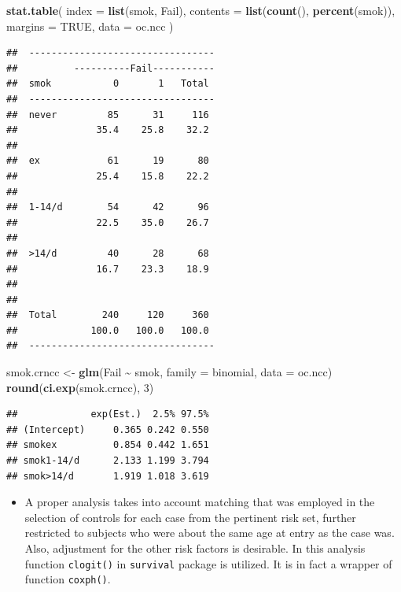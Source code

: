 \documentclass[
]{book}
\newenvironment{Shaded}{\begin{snugshade}}{\end{snugshade}}
\newcommand{\AttributeTok}[1]{\textcolor[rgb]{0.13,0.29,0.53}{#1}}
\newcommand{\ConstantTok}[1]{\textcolor[rgb]{0.56,0.35,0.01}{#1}}
\newcommand{\DecValTok}[1]{\textcolor[rgb]{0.00,0.00,0.81}{#1}}
\newcommand{\FunctionTok}[1]{\textcolor[rgb]{0.13,0.29,0.53}{\textbf{#1}}}
\newcommand{\NormalTok}[1]{#1}
\newcommand{\OtherTok}[1]{\textcolor[rgb]{0.56,0.35,0.01}{#1}}
\newcommand{\SpecialCharTok}[1]{\textcolor[rgb]{0.81,0.36,0.00}{\textbf{#1}}}
\providecommand{\tightlist}{%
  \setlength{\itemsep}{0pt}\setlength{\parskip}{0pt}}
\theoremstyle{definition}
\theoremstyle{definition}
\theoremstyle{definition}
\theoremstyle{definition}
\theoremstyle{remark}
\begin{document}
\begin{Shaded}
\begin{Highlighting}[]
\FunctionTok{stat.table}\NormalTok{(}
  \AttributeTok{index =} \FunctionTok{list}\NormalTok{(smok, Fail),}
  \AttributeTok{contents =} \FunctionTok{list}\NormalTok{(}\FunctionTok{count}\NormalTok{(), }\FunctionTok{percent}\NormalTok{(smok)),}
  \AttributeTok{margins =} \ConstantTok{TRUE}\NormalTok{, }
  \AttributeTok{data =}\NormalTok{ oc.ncc}
\NormalTok{)}
\end{Highlighting}
\end{Shaded}

\begin{verbatim}
##  --------------------------------- 
##          ----------Fail----------- 
##  smok           0       1   Total  
##  --------------------------------- 
##  never         85      31     116  
##              35.4    25.8    32.2  
##                                    
##  ex            61      19      80  
##              25.4    15.8    22.2  
##                                    
##  1-14/d        54      42      96  
##              22.5    35.0    26.7  
##                                    
##  >14/d         40      28      68  
##              16.7    23.3    18.9  
##                                    
##                                    
##  Total        240     120     360  
##             100.0   100.0   100.0  
##  ---------------------------------
\end{verbatim}

\begin{Shaded}
\begin{Highlighting}[]
\NormalTok{smok.crncc }\OtherTok{\textless{}{-}} \FunctionTok{glm}\NormalTok{(Fail }\SpecialCharTok{\textasciitilde{}}\NormalTok{ smok, }\AttributeTok{family =}\NormalTok{ binomial, }\AttributeTok{data =}\NormalTok{ oc.ncc)}
\FunctionTok{round}\NormalTok{(}\FunctionTok{ci.exp}\NormalTok{(smok.crncc), }\DecValTok{3}\NormalTok{)}
\end{Highlighting}
\end{Shaded}

\begin{verbatim}
##             exp(Est.)  2.5% 97.5%
## (Intercept)     0.365 0.242 0.550
## smokex          0.854 0.442 1.651
## smok1-14/d      2.133 1.199 3.794
## smok>14/d       1.919 1.018 3.619
\end{verbatim}

\begin{itemize}
\tightlist
\item
  A proper analysis takes into account matching that was employed
  in the selection of controls for each case from the
  pertinent risk set, further restricted to
  subjects who were about the same age at entry as the case was.
  Also, adjustment for the other risk factors is desirable.
  In this analysis function \texttt{clogit()} in \texttt{survival} package is
  utilized. It is in fact a wrapper of function \texttt{coxph()}.
\end{itemize}
\end{document}
